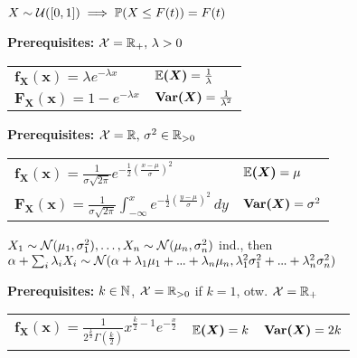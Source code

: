 \begin{lemma}
  \(X \sim \operatorname{\mathcal{U}}([0, 1]) \implies \mathbb{P}(X \leq F(t)) = F(t)\)
\end{lemma}

\begin{cdefinition*}
  \textbf{Prerequisites:} \(\operatorname{\mathcal{X}} = \mathbb{R}_+, \, \lambda > 0\) \\
  \begin{tabularx}{\linewidth}{@{}ll@{}}
    \(\bm{f_X(x)} = \lambda e^{-\lambda x}\) & \(\bm{\mathbb{E}(X)} = \frac{1}{\lambda}\) \\
    \(\bm{F_X(x)} = 1 - e^{-\lambda x}\) & \(\bm{\Var(X)} = \frac{1}{\lambda^2}\)
  \end{tabularx}
\end{cdefinition*}

\begin{cdefinition*}
  \textbf{Prerequisites:} \(\operatorname{\mathcal{X}} = \mathbb{R}, \, \sigma^2 \in \mathbb{R}_{>0}\) \\
  \begin{tabularx}{\linewidth}{@{}ll@{}}
    \(\bm{f_X(x)} = \frac{1}{\sigma\sqrt{2 \pi}}e^{-\frac{1}{2}\left(\frac{x - \mu}{\sigma}\right)^2}\) & \(\bm{\mathbb{E}(X)} = \mu\) \\
    \(\bm{F_X(x)} = \frac{1}{\sigma\sqrt{2 \pi}}\int_{-\infty}^xe^{-\frac{1}{2}\left(\frac{y - \mu}{\sigma}\right)^2} \, dy\) & \(\bm{\Var(X)} = \sigma^2\)
  \end{tabularx}
\end{cdefinition*}

\begin{lemma}
  \(X_1 \sim \operatorname{\mathcal{N}}(\mu_1, \sigma_1^2), \ldots, X_n \sim \operatorname{\mathcal{N}}(\mu_n, \sigma_n^2)\) ind., then \(\alpha + \sum_i \lambda_i X_i \sim \Normal(\alpha + \lambda_1 \mu_1 + \sdots + \lambda_n \mu_n, \lambda_1^2 \sigma_1^2 + \sdots + \lambda_n^2 \sigma_n^2)\)
\end{lemma}

\begin{cdefinition*}
  \textbf{Prerequisites:} \(k \in \mathbb{N}\), \(\operatorname{\mathcal{X}} = \mathbb{R}_{>0}\) if \(k = 1\), otw. \(\operatorname{\mathcal{X}} = \mathbb{R}_+\) \\
  \begin{tabularx}{\linewidth}{@{}lll@{}}
    \(\bm{f_X(x)} = \frac{1}{2^{\frac{k}{2}}\Gamma(\frac{k}{2})} x^{\frac{k}{2}-1}e^{-\frac{x}{2}}\) & \(\bm{\mathbb{E}(X)} = k\) & \(\bm{\Var(X)} = 2k\)
  \end{tabularx}
\end{cdefinition*}

